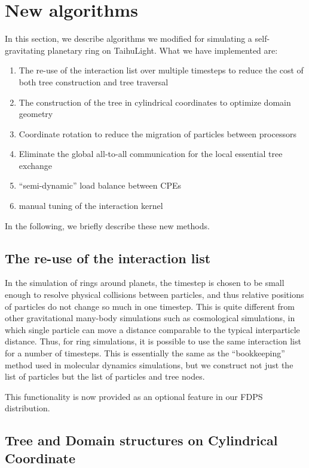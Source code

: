 \documentclass[oribibl]{llncs}
\begin{document}
\section{New algorithms}
\label{sec:impl1}

In this section, we describe algorithms we modified for simulating
a self-gravitating planetary ring on TaihuLight. What we have
implemented are:

\begin{enumerate}
\item The re-use of the interaction list over multiple timesteps to
  reduce the cost of both tree construction and tree traversal
\item The construction of the tree in cylindrical coordinates to optimize
  domain geometry
\item Coordinate rotation to reduce the migration of particles between
  processors
\item Eliminate the global all-to-all communication for the local
  essential tree exchange
\item ``semi-dynamic'' load balance between CPEs
\item manual tuning of the interaction kernel
\end{enumerate}  

In the following, we briefly describe these new methods.

\subsection{The re-use of the interaction list}
\label{subsec:list}

In the simulation of rings around planets, the timestep is chosen to
be small enough to resolve physical collisions between particles, and
thus relative positions of particles do not change so much in one
timestep. This is quite different from other gravitational many-body
simulations such as cosmological simulations, in which single particle
can move a distance comparable to the typical interparticle
distance. Thus, for ring simulations, it is possible to use the same
interaction list for a number of timesteps. This is essentially the
same as the ``bookkeeping'' method used in molecular dynamics
simulations, but we construct not just the list of particles but the
list of particles and tree nodes.

This functionality is now provided as an optional feature in our FDPS
distribution. 

\subsection{Tree and Domain structures on Cylindrical Coordinate}
\label{subsec:cylcoord}
\end{document}
